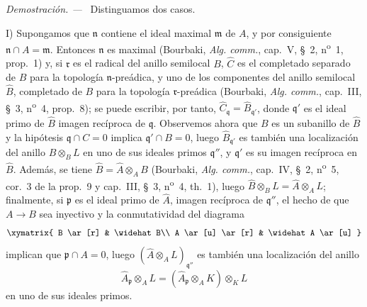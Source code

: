 \documentclass[10pt,oneside]{book}
\newcommand{\oldpage}[2][]{%
  \setcounter{footnote}{0}%
  \marginpar{\scriptsize\textbf{#1}~|~#2}\ignorespaces}
\newenvironment{proof}{%
  \par\medskip\noindent\textit{Demostración. ---\ }}{\par}
\begin{document}
\begin{proof}
Distinguamos dos casos.

I) Supongamos que $\mathfrak n$ contiene el ideal maximal $\mathfrak m$ de
$A$, y por consiguiente $\mathfrak n\cap A=\mathfrak m$. Entonces
$\mathfrak n$ es maximal (Bourbaki, \emph{Alg. comm.}, cap.~V, §~2,
n\textsuperscript{o}~1, prop.~1) y, si $\mathfrak r$ es el radical del anillo
semilocal $B$, $\widehat C$ es el completado separado de $B$ para la topología
$\mathfrak n$-preádica, y uno de los componentes del anillo semilocal
$\widehat B$, completado de $B$ para la topología $\mathfrak r$-preádica
(Bourbaki, \emph{Alg. comm.}, cap.~III, §~3, n\textsuperscript{o}~4,
prop.~8); se puede escribir, por tanto,
$\widehat C_\mathfrak q=\widehat B_{\mathfrak q'}$, donde $\mathfrak q'$ es
el ideal primo de $\widehat B$ imagen recíproca de $\mathfrak q$. Observemos
ahora que $B$ es un subanillo de $\widehat B$ y la hipótesis
$\mathfrak q\cap C=0$ implica $\mathfrak q'\cap B=0$, luego
$\widehat B_{\mathfrak q'}$ es también una localización del anillo
$\widehat B\otimes_B L$ en uno de sus ideales primos $\mathfrak q''$, y
$\mathfrak q'$ es su imagen recíproca en $\widehat B$. Además, se tiene
$\widehat B=\widehat A\otimes_A B$ (Bourbaki, \emph{Alg. comm.}, cap.~IV,
§~2, n\textsuperscript{o}~5, cor.~3 de la prop.~9 y cap.~III, §~3,
n\textsuperscript{o}~4, th.~1), luego
$\widehat B\otimes_B L=\widehat A\otimes_A L$; finalmente, si $\mathfrak p$
es el ideal primo de $\widehat A$, imagen recíproca de $\mathfrak q''$, el
hecho de que $A\to B$ sea inyectivo y la conmutatividad del diagrama
\[
  \xymatrix{
    B \ar[r] & \widehat B\\
    A \ar[u] \ar[r] & \widehat A \ar[u]
  }
\]
implican que $\mathfrak p\cap A=0$, luego
$(\widehat A\otimes_A L)_{\mathfrak q''}$ es también una localización del
anillo
\[
  \widehat A_\mathfrak p\otimes_A L
  =(\widehat A_\mathfrak p\otimes_A K)\otimes_K L
\]
en uno de sus ideales primos.

\oldpage[0\textsubscript{IV-1}]{192}


\end{proof}
\end{document}
